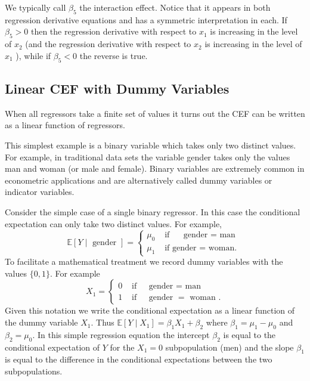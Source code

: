 \documentclass[10pt]{article}
\begin{document}
We typically call $\beta_{5}$ the interaction effect. Notice that it appears in both regression derivative equations and has a symmetric interpretation in each. If $\beta_{5}>0$ then the regression derivative with respect to $x_{1}$ is increasing in the level of $x_{2}$ (and the regression derivative with respect to $x_{2}$ is increasing in the level of $x_{1}$ ), while if $\beta_{5}<0$ the reverse is true.

\subsection{Linear CEF with Dummy Variables}
When all regressors take a finite set of values it turns out the CEF can be written as a linear function of regressors.

This simplest example is a binary variable which takes only two distinct values. For example, in traditional data sets the variable gender takes only the values man and woman (or male and female). Binary variables are extremely common in econometric applications and are alternatively called dummy variables or indicator variables.

Consider the simple case of a single binary regressor. In this case the conditional expectation can only take two distinct values. For example,
$$
\mathbb{E}[Y \mid \text { gender }]=\left\{\begin{array}{llc}
\mu_{0} & \text { if } \quad \text { gender }=\text { man } \\
\mu_{1} & \text { if gender }=\text { woman. }
\end{array}\right.
$$
To facilitate a mathematical treatment we record dummy variables with the values $\{0,1\}$. For example
$$
X_{1}=\left\{\begin{array}{llc}
0 & \text { if } & \text { gender }=\text { man } \\
1 & \text { if } & \text { gender }=\text { woman } .
\end{array}\right.
$$
Given this notation we write the conditional expectation as a linear function of the dummy variable $X_{1}$. Thus $\mathbb{E}\left[Y \mid X_{1}\right]=\beta_{1} X_{1}+\beta_{2}$ where $\beta_{1}=\mu_{1}-\mu_{0}$ and $\beta_{2}=\mu_{0}$. In this simple regression equation the intercept $\beta_{2}$ is equal to the conditional expectation of $Y$ for the $X_{1}=0$ subpopulation (men) and the slope $\beta_{1}$ is equal to the difference in the conditional expectations between the two subpopulations.
\end{document}

